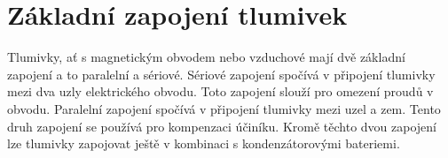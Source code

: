 \section{Základní zapojení tlumivek} Tlumivky, ať s magnetickým obvodem nebo vzduchové mají dvě základní zapojení a to paralelní a sériové. Sériové zapojení spočívá v připojení tlumivky mezi dva uzly elektrického obvodu. Toto zapojení slouží pro omezení proudů v obvodu. Paralelní zapojení spočívá  v připojení tlumivky mezi uzel a zem. Tento druh zapojení se používá pro kompenzaci účiníku. Kromě těchto dvou zapojení lze tlumivky zapojovat ještě v kombinaci s kondenzátorovými bateriemi.